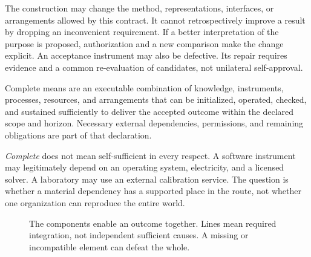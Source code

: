 The construction may change the method, representations, interfaces, or arrangements allowed by this contract. It cannot retrospectively improve a result by dropping an inconvenient requirement. If a better interpretation of the purpose is proposed, authorization and a new comparison make the change explicit. An acceptance instrument may also be defective. Its repair requires evidence and a common re-evaluation of candidates, not unilateral self-approval.

\begin{definition}
Complete means are an executable combination of knowledge, instruments, processes, resources, and arrangements that can be initialized, operated, checked, and sustained sufficiently to deliver the accepted outcome within the declared scope and horizon. Necessary external dependencies, permissions, and remaining obligations are part of that declaration.
\end{definition}

\emph{Complete} does not mean self-sufficient in every respect. A software instrument may legitimately depend on an operating system, electricity, and a licensed solver. A laboratory may use an external calibration service. The question is whether a material dependency has a supported place in the route, not whether one organization can reproduce the entire world.

\begin{figure}[htbp]
\centering
{}
\caption{The components enable an outcome together. Lines mean required integration, not independent sufficient causes. A missing or incompatible element can defeat the whole.}
\end{figure}

